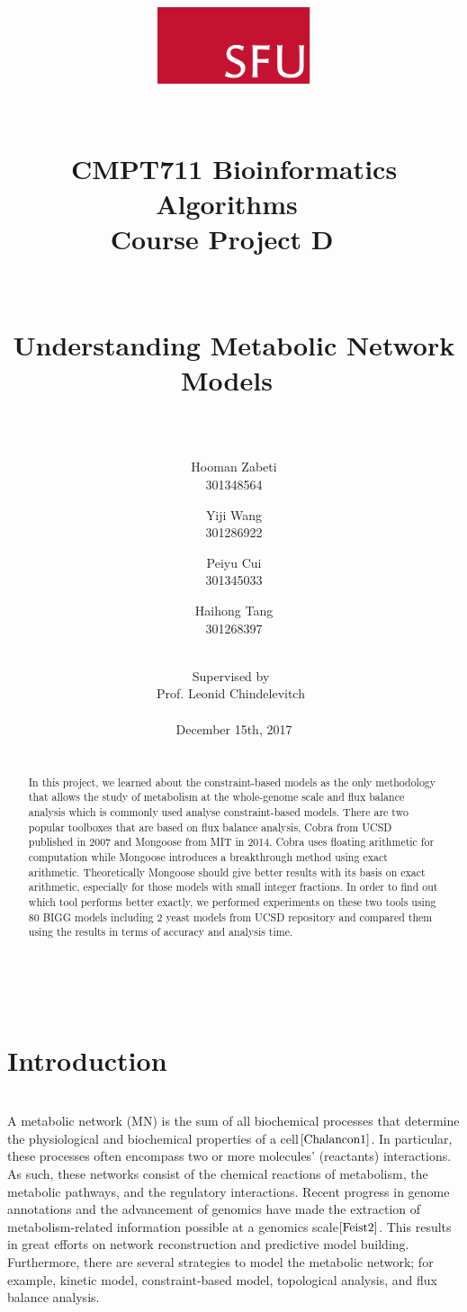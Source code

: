 \documentclass[11pt, a4paper]{article}
\title{
	\begin{figure}[H]
  		\centering
      	\includegraphics[width=0.4\textwidth]{SFU_logo.jpg}
	\end{figure}
	~\\
	\large CMPT711 Bioinformatics Algorithms~\\Course Project D ~\\~\\~\\
	\Huge\textbf{Understanding Metabolic Network Models~\\~\\}}
\author{Hooman Zabeti\\301348564\and Yiji Wang\\301286922\and Peiyu Cui\\301345033\and Haihong Tang\\301268397}
\date{~\\Supervised by~\\Prof. Leonid Chindelevitch~\\~\\December 15th, 2017}
\begin{document}
	\nocite{*}
    \maketitle
    \thispagestyle{empty}
    ~\\
    \begin{abstract}
    ~\\In this project, we learned about the constraint-based models as the only methodology that allows the study of metabolism at the whole-genome scale and flux balance analysis which is commonly used analyse constraint-based models. There are two popular toolboxes that are based on flux balance analysis, Cobra from UCSD published in 2007 and Mongoose from MIT in 2014. Cobra uses floating arithmetic for computation while Mongoose introduces a breakthrough method using exact arithmetic. Theoretically Mongoose should give better results with its basis on exact arithmetic, especially for those models with small integer fractions. In order to find out which tool performs better exactly, we performed experiments on these two tools using 80 BIGG models including 2 yeast models from UCSD repository and compared them using the results in terms of accuracy and analysis time.
    \end{abstract}
    \newpage
    \linespread{2}
    \tableofcontents
    \thispagestyle{empty}
	\newpage
	\linespread{1}
	\section{Introduction}
	\setcounter{page}{1}
	~\\A metabolic network (MN) is the sum of all biochemical processes that determine the physiological and biochemical properties of a cell$\cite{Chalancon1}$. In particular, these processes often encompass two or more molecules' (reactants) interactions. As such, these networks consist of the chemical reactions of metabolism, the metabolic pathways, and the regulatory interactions. Recent progress in genome annotations and the advancement of genomics have made the extraction of metabolism-related information possible at a genomics scale$\cite{Feist2}$. This results in great efforts on network reconstruction and predictive model building. Furthermore, there are several strategies to model the metabolic network; for example, kinetic model, constraint-based model, topological analysis, and flux balance analysis.
\end{document}
